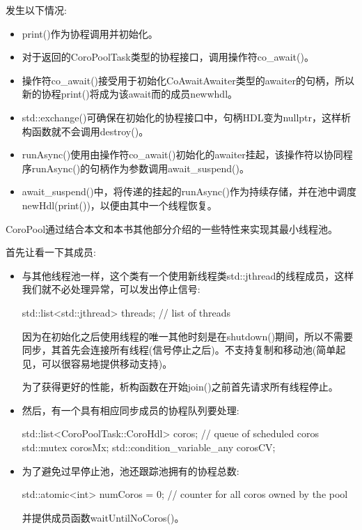发生以下情况:

\begin{itemize}
\item
print()作为协程调用并初始化。

\item
对于返回的CoroPoolTask类型的协程接口，调用操作符co\_await()。

\item
操作符co\_await()接受用于初始化CoAwaitAwaiter类型的awaiter的句柄，所以新的协程print()将成为该await而的成员newwhdl。

\item
std::exchange()可确保在初始化的协程接口中，句柄HDL变为nullptr，这样析构函数就不会调用destroy()。

\item
runAsync()使用由操作符co\_await()初始化的awaiter挂起，该操作符以协同程序runAsync()的句柄作为参数调用await\_suspend()。

\item
await\_suspend()中，将传递的挂起的runAsync()作为持续存储，并在池中调度newHdl(print())，以便由其中一个线程恢复。
\end{itemize}


CoroPool通过结合本文和本书其他部分介绍的一些特性来实现其最小线程池。

首先让看一下其成员:

\begin{itemize}
\item
与其他线程池一样，这个类有一个使用新线程类std::jthread的线程成员，这样我们就不必处理异常，可以发出停止信号:

\begin{cpp}
std::list<std::jthread> threads; // list of threads
\end{cpp}

因为在初始化之后使用线程的唯一其他时刻是在shutdown()期间，所以不需要同步，其首先会连接所有线程(信号停止之后)。不支持复制和移动池(简单起见，可以很容易地提供移动支持)。

为了获得更好的性能，析构函数在开始join()之前首先请求所有线程停止。

\item
然后，有一个具有相应同步成员的协程队列要处理:

\begin{cpp}
std::list<CoroPoolTask::CoroHdl> coros; // queue of scheduled coros
std::mutex corosMx;
std::condition_variable_any corosCV;
\end{cpp}

\item
为了避免过早停止池，池还跟踪池拥有的协程总数:

\begin{cpp}
std::atomic<int> numCoros = 0; // counter for all coros owned by the pool
\end{cpp}

并提供成员函数waitUntilNoCoros()。
\end{itemize}

